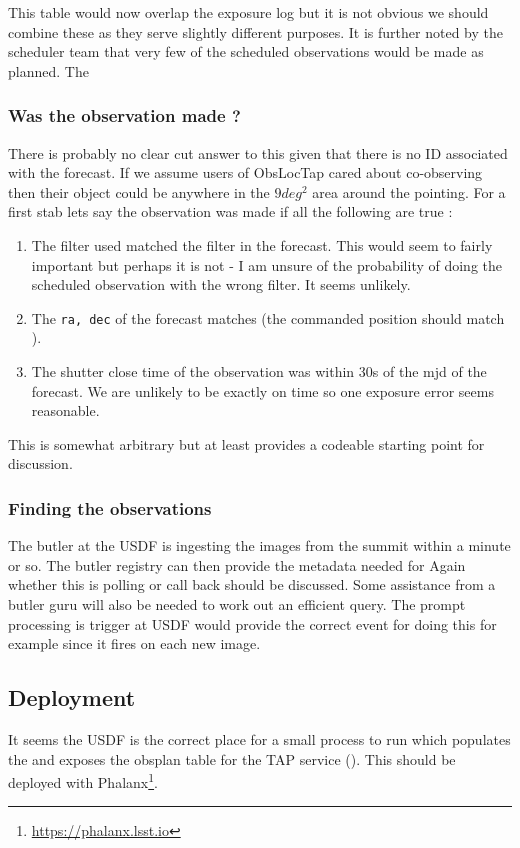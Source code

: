 This table would now overlap the exposure log but it is not obvious we should combine these as they serve slightly different purposes.
It is further noted by the scheduler team that very few of the scheduled observations would be made as planned. The

\subsubsection{Was the  observation made ?}\label{sec:made}
There is probably no clear cut answer to this given that there is no ID associated with the forecast.
If we assume users of ObsLocTap cared about co-observing then their object could be anywhere in the
$9 deg^2$ area around the pointing.
For a first stab lets say the observation was made if all the following are true :

\begin{enumerate}
\item The filter used matched the filter in the forecast.
This would seem to fairly important but perhaps it is not - I am unsure of the probability of
doing the scheduled observation with the wrong filter. It seems unlikely.
\item The \texttt {ra, dec} of the forecast matches (the commanded position should match ).
\item The shutter close time of the observation was within 30s of the mjd of the forecast.
We are unlikely to be exactly on time so one exposure error seems reasonable.
\end{enumerate}

This is somewhat arbitrary but at least provides a codeable starting point for discussion.

\subsubsection{Finding the observations}
The butler at the USDF is ingesting the images from the summit within a minute or so.
The butler registry can then provide the metadata needed for  
Again whether this is polling or call back should be discussed.
Some assistance from  a butler guru will also be needed to work out an efficient query.
The prompt processing is trigger at USDF would provide the correct event for doing this for example since it fires on each new image.

\subsection{Deployment}
It seems the USDF is the correct place for a small process to run which populates the \DB and exposes the obsplan table for the TAP service ().
This should be deployed with Phalanx\footnote{\url{https://phalanx.lsst.io}}.

